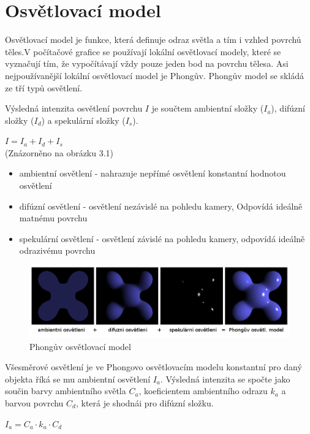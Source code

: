 \documentclass[11pt,twoside,a4paper]{book}
\begin{document}
\section{Osvětlovací model}
Osvětlovací model je funkce, která definuje odraz světla a tím i vzhled povrchů těles.\linebreak V počítačové grafice se používají lokální osvětlovací modely, které se vyznačují tím, že vypočítávají vždy pouze jeden bod na povrchu tělesa. Asi nejpoužívanější lokální osvětlovací model je Phongův. Phongův model se skládá ze tří typů osvětlení.

Výsledná intenzita osvětlení povrchu $I$ je součtem ambientní složky ($I_a$), difúzní složky ($I_d$) a spekulární složky ($I_s$).
\begin{center}
$I = I_a + I_d + I_s$\\
(Znázorněno na obrázku 3.1)
\end{center}

\begin{itemize}
\item ambientní osvětlení - nahrazuje nepřímé osvětlení konstantní hodnotou osvětlení
\item difúzní osvětlení - osvětlení nezávislé na pohledu kamery, Odpovídá ideálně matnému povrchu
\item spekulární osvětlení - osvětlení závislé na pohledu kamery, odpovídá ideálně odrazivému povrchu
\end{itemize}
\newpage

\begin{center}
\begin{figure}[h!]
\includegraphics[width=150mm]{figures/phong.png}
\caption{Phongův osvětlovací model}
\end{figure}
\end{center}

Všesměrové osvětlení je ve Phongovo osvětlovacím modelu konstantní pro daný objekt\linebreak a říká se mu ambientní osvětlení $I_a$. Výsledná intenzita se spočte jako součin barvy ambientního světla $C_a$, koeficientem ambientního odrazu $k_a$ a barvou povrchu $C_d$, která je shodná\linebreak i pro difúzní složku.
\begin{center}
$I_a = C_a \cdot k_a \cdot C_d$
\end{center}
\end{document}
